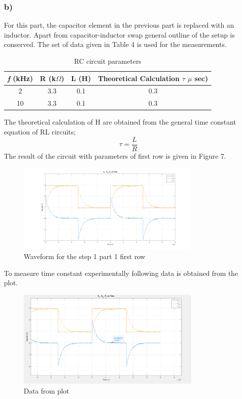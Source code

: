\documentclass[letterpaper,12pt]{article}
\begin{document}
\subsubsection{b)}
For this part, the capacitor  element in the previous part is replaced with an inductor. Apart from capacitor-inductor swap general outline of the setup is conserved.
The set of data given in Table 4 is used for the measurements.

\begin{table}[H]
\begin{center}
\caption{RC circuit parameters}
\vspace{2mm}
	\begin{tabular}{||c | c | c | c||} 
	 \hline
	 \emph{f} (kHz) & R (k\(\Omega\)) & L (H) & Theoretical Calculation \(\tau\) \(\mu\) sec) \\ [0.5ex] 
	 \hline\hline
	 2 & 3.3 & 0.1 & 0.3 \\ 
	 \hline
	 10& 3.3 & 0.1  &   0.3 \\
	 \hline
\end{tabular}
\end{center}
\end{table}
The theoretical calculation of H are obtained from the general time constant equation of RL circuits;
\[\tau = \frac{L}{R}\]
The result of the circuit with parameters of first row is given in Figure 7.

\begin{figure}[H]
	\centering
   \includegraphics[width=0.8\textwidth]{1b.png}
   \caption{Waveform for the step 1 part 1 first row}
\end{figure} 
To measure time constant experimentally following data is obtained from the plot.
\begin{figure}[H]
	\centering
   \includegraphics[width=0.8\textwidth]{1_b_plot_data.png}
   \caption{Data from plot}
\end{figure} 
\end{document}
